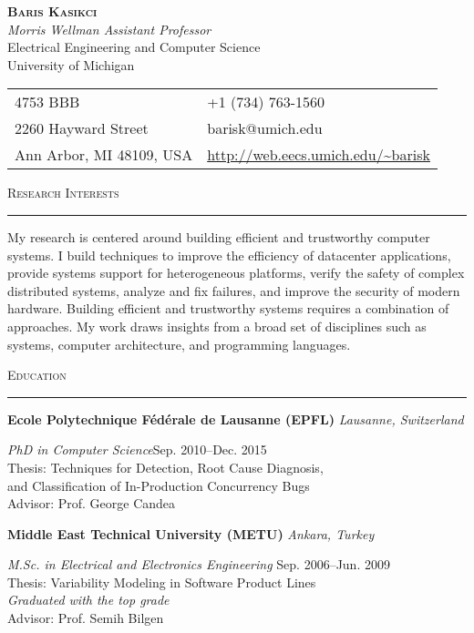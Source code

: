 \documentclass[10pt]{article}
\newcommand{\mysec}[1]{\vspace{2em}\textsc{\large #1}\vspace{1mm}\hrule\vspace{2mm}}
\newcommand{\mysub}[3]{\textbf{#1} {#2} \hfill {\em #3}}
\newcommand{\myssub}[1]{\hspace*{2mm}\parbox{163mm}{#1}\vspace*{2mm}}
\begin{document}
\begin{center}
{\Large \textbf{\textsc{Baris Kasikci}}} \vspace{1mm} \\
{\em Morris Wellman Assistant Professor} \\
Electrical Engineering and Computer Science \\
University of Michigan
\end{center}

\vspace{1em}

\hspace{0.8in}
\begin{tabular}{@{}p{2.5in}p{4in}}
4753 BBB & +1 (734) 763-1560\\
2260 Hayward Street & barisk@umich.edu \\
Ann Arbor, MI 48109, USA & \url{http://web.eecs.umich.edu/~barisk} \\
\end{tabular}


\mysec{Research Interests}

My research is centered around building efficient and trustworthy computer systems. I build techniques to improve the efficiency of datacenter applications, provide systems support for heterogeneous platforms, verify the safety of complex distributed systems, analyze and fix failures, and improve the security of modern hardware. Building efficient and trustworthy systems requires a combination of approaches. My work draws insights from a broad set of disciplines such as systems, computer architecture, and programming languages.

\mysec{Education}

\mysub{Ecole Polytechnique F\'ed\'erale de Lausanne (EPFL)}{}{Lausanne, Switzerland} \vspace*{1mm} \\
\myssub{\vspace{2mm}\textit{PhD in Computer Science}\hfill Sep. 2010--Dec. 2015 \\
Thesis: Techniques for Detection, Root Cause Diagnosis, \\ \phantom{xxxxxx} and Classification of In-Production Concurrency Bugs \\
Advisor: Prof. George Candea} \vspace{1mm}

\mysub{Middle East Technical University (METU)}{}{Ankara, Turkey} \vspace*{1mm} \\
\myssub{\vspace{2mm}\textit{M.Sc. in Electrical and Electronics Engineering} \hfill Sep. 2006--Jun. 2009 \\
Thesis:  Variability Modeling in Software Product Lines \\
{\textit{Graduated with the top grade}} \\
Advisor: Prof. Semih Bilgen} \vspace*{1mm}
\end{document}
